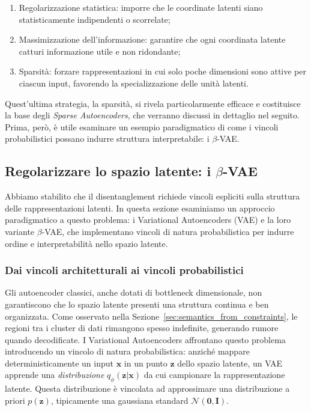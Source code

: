 \begin{enumerate}[label=\roman*.]
    \item Regolarizzazione statistica: imporre che le coordinate latenti siano statisticamente indipendenti o scorrelate;
    \item Massimizzazione dell'informazione: garantire che ogni coordinata latente catturi informazione utile e non ridondante;
    \item Sparsità: forzare rappresentazioni in cui solo poche dimensioni sono attive per ciascun input, favorendo la specializzazione delle unità latenti.
\end{enumerate}

Quest'ultima strategia, la sparsità, si rivela particolarmente efficace e costituisce la base degli \textit{Sparse Autoencoders}, che verranno discussi in dettaglio nel seguito. Prima, però, è utile esaminare un esempio paradigmatico di come i vincoli probabilistici possano indurre struttura interpretabile: i $\beta$-VAE.

\subsection{Regolarizzare lo spazio latente: i \texorpdfstring{$\beta$}{beta}-VAE}
\label{sec:beta_vae}

Abbiamo stabilito che il disentanglement richiede vincoli espliciti sulla struttura delle rappresentazioni latenti. In questa sezione esaminiamo un approccio paradigmatico a questo problema: i Variational Autoencoders (VAE) e la loro variante $\beta$-VAE, che implementano vincoli di natura probabilistica per indurre ordine e interpretabilità nello spazio latente.

\subsubsection{Dai vincoli architetturali ai vincoli probabilistici}
 
Gli autoencoder classici, anche dotati di bottleneck dimensionale, non garantiscono che lo spazio latente presenti una struttura continua e ben organizzata. Come osservato nella Sezione~\ref{sec:semantics_from_constraints}, le regioni tra i cluster di dati rimangono spesso indefinite, generando rumore quando decodificate.
I Variational Autoencoders affrontano questo problema introducendo un vincolo di natura probabilistica: anziché mappare deterministicamente un input $\mathbf{x}$ in un punto $\mathbf{z}$ dello spazio latente, un VAE apprende una \textit{distribuzione} $q_\phi(\mathbf{z}|\mathbf{x})$ da cui campionare la rappresentazione latente. Questa distribuzione è vincolata ad approssimare una distribuzione a priori $p(\mathbf{z})$, tipicamente una gaussiana standard $\mathcal{N}(\mathbf{0}, \mathbf{I})$.

